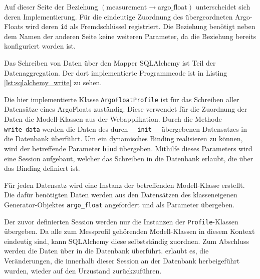 
Auf dieser Seite der Beziehung   $\left( \mbox{measurement} \to \mbox{argo\_float} \right)$ unterscheidet sich deren Implementierung. Für die eindeutige Zuordnung des übergeordneten Argo-Floats wird deren \texttt{id} als Fremdschlüssel registriert. Die Beziehung benötigt neben dem Namen der anderen Seite keine weiteren Parameter, da die Beziehung bereits konfiguriert worden ist.



Das Schreiben von Daten über den Mapper SQLAlchemy ist Teil der Datenaggregation. Der dort implementierte Programmcode ist in Listing \ref{lst:sqlalchemy_write} zu sehen.




Die hier implementierte Klasse \texttt{ArgoFloatProfile} ist für das Schreiben aller Datensätze eines ArgoFloats zuständig. Diese verwendet für die Zuordnung der Daten die Modell-Klassen aus der Webapplikation. Durch die Methode \texttt{write\_data} werden die Daten des durch \texttt{\_\_init\_\_} übergebenen Datensatzes in die Datenbank überführt.
Um ein dynamisches Binding realisieren zu können, wird der betreffende Parameter \texttt{bind} übergeben. Mithilfe dieses Parameters wird eine Session aufgebaut, welcher das Schreiben in die Datenbank erlaubt, die über das Binding definiert ist.

Für jeden Datensatz wird eine Instanz der betreffenden Modell-Klasse erstellt. Die dafür benötigten Daten werden aus den Datensätzen des klasseneigenen Generator-Objektes \texttt{argo\_float} angefordert und als Parameter übergeben.

Der zuvor definierten Session werden nur die Instanzen der \texttt{Profile}-Klassen übergeben. Da alle zum Messprofil gehörenden Modell-Klassen in diesem Kontext eindeutig sind, kann SQLAlchemy diese selbstständig zuordnen.
Zum Abschluss werden die Daten über  in die Datenbank überführt.
 erlaubt es, die Veränderungen, die innerhalb dieser Session an der Datenbank herbeigeführt wurden, wieder auf den Urzustand zurückzuführen.  \\

